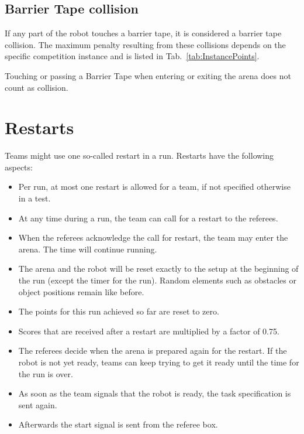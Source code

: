 \subsection{Barrier Tape collision}
If any part of the robot touches a barrier tape, it is considered a barrier tape collision. The maximum penalty resulting from these collisions depends on the specific competition instance and is listed in Tab.~\ref{tab:InstancePoints}.

Touching or passing a Barrier Tape when entering or exiting the arena does not count as collision.






\section{Restarts}
Teams might use one so-called restart in a run. Restarts have the following aspects:

\begin{itemize}

	\item Per run, at most one restart is allowed for a team, if not specified otherwise in a test.
	\item At any time during a run, the team can call for a restart to the referees.
	\item When the referees acknowledge the call for restart, the team may enter the arena. The time will continue running.
	\item The arena and the robot will be reset exactly to the setup at the beginning of the run (except the timer for the run). Random elements such as obstacles or object positions remain like before.
	\item The points for this run achieved so far are reset to zero.
	\item Scores that are received after a restart are multiplied by a factor of 0.75.
	\item The referees decide when the arena is prepared again for the restart. If 	the robot is not yet ready, teams can keep trying to get it ready until the time for the run is over.
	\item As soon as the team signals that the robot is ready, the task specification is sent again.
	\item Afterwards the start signal is sent from the referee box.

\end{itemize}


